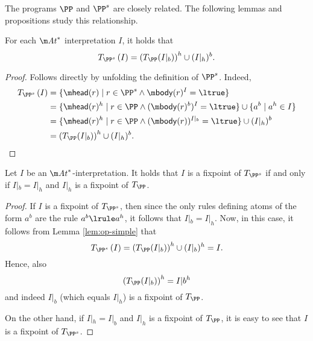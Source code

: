 The programs $\PP$ and $\PP^s$ are closely related. The following lemmas and propositions study this relationship. 

\begin{lemma}
  \label{lem:op-simple}
  For each $\atoms^*$ interpretation  $I$, it holds that 
  \[ T_{\PP^s}\left(I\right) = \left(T_\PP(I|_b)\right)^h\cup (I|_h)^b.\]
\end{lemma}
\begin{proof}
Follows directly by unfolding the definition of $\PP^s$. Indeed,
  \begin{align*}
    T_{\PP^s}\left(I\right) &= \{\head(r)\mid r\in \PP^s\land \body(r)^I=\ltrue\} \\
    &= \{\head(r)^h\mid r\in \PP \land (\body(r)^b)^{I}=\ltrue\}\cup\{a^b\mid a^h\in I\} \\
    &= \{\head(r)^h\mid r\in \PP \land (\body(r))^{I|_b}=\ltrue\}\cup (I|_h)^b \\
    &= \left(T_\PP(I|_b)\right)^h\cup (I|_h)^b.\qedhere
  \end{align*}
\end{proof}

\begin{proposition}
  \label{prop:simple-fp}
  Let $I$ be an $\atoms^*$-interpretation. It holds that $I$ is a fixpoint of  $T_{\PP^s}$ if and only if $I|_b=I|_h$ and $I|_h$ is a fixpoint of $T_\PP$.
\end{proposition}
\begin{proof}
If $I$ is a fixpoint of $T_{\PP^s}$, then since the only rules defining atoms of the form $a^b$ are the rule $a^b\lrule a^h$, it follows that  $I|_b=I|_h$. 
Now, in this case, it follows from Lemma \ref{lem:op-simple} that 
\[ T_{\PP^s}\left(I\right) = \left(T_\PP(I|_b)\right)^h\cup (I|_b)^h = I .\]
Hence, also 
\[\left(T_\PP(I|_b)\right)^h=I|b^h\]
and indeed $I|_b$ (which equals $I|_h$) is a fixpoint of $T_\PP$. 

On the other hand, if $I|_h=I|_b$ and $I|_h$ is a fixpoint of $T_\PP$, it is easy to see that $I$ is a fixpoint of $T_{\PP^s}$.
% 
% 
\end{proof}


